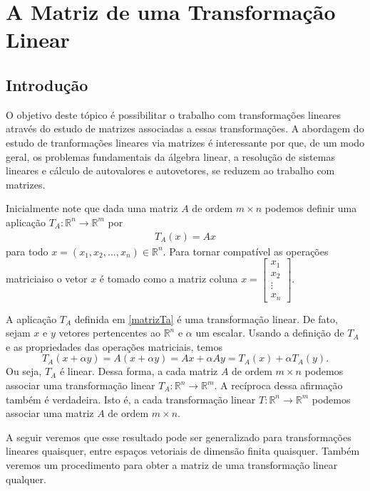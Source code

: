 \chapter{A Matriz de uma Transformação  Linear}
\thispagestyle{empty}

\section{Introdução}
O objetivo deste tópico é  possibilitar o trabalho com  transformações lineares através do estudo de  matrizes associadas a essas transformações. A abordagem do estudo de tranformações lineares via matrizes é interessante por que, de um modo geral, os problemas fundamentais da álgebra linear, a resolução de sistemas lineares e cálculo de autovalores e autovetores, se reduzem ao  trabalho com matrizes.


Inicialmente note que dada uma matriz $A$ de ordem $m\times n$ podemos definir uma aplicação $T_A: \mathbb{R}^n \rightarrow \mathbb{R}^m$ por
\begin{align}
T_A(x)=Ax \label{matrizTa}
\end{align}
para todo $x=(x_1, x_2, ..., x_n) \in \mathbb{R}^n$. Para tornar compatível as operações matriciaiso o vetor $x$ é tomado como a matriz coluna $x=\left[ \begin{array}{c}x_1 \\ x_2 \\ \vdots \\ x_n\end{array} \right]$.

 A aplicação $T_A$ definida em \eqref{matrizTa} é uma transformação  linear.  De fato, sejam  $x$ e $y$  vetores pertencentes ao $\mathbb{R}^n$ e  $\alpha$ um escalar. Usando a definição de $T_A$ e as  propriedades das operações matriciais,  temos $$T_A(x+\alpha y)=A(x+\alpha y)=Ax+\alpha Ay=T_A(x)+\alpha T_A(y).$$
Ou seja, $T_A$ é linear.  Dessa forma, a cada matriz $A$ de ordem $m\times n$ podemos associar uma transformação linear  $T_A: \mathbb{R}^n \rightarrow \mathbb{R}^m$. A recíproca dessa afirmação também é verdadeira. Isto é, a cada transformação linear $T: \mathbb{R}^n \rightarrow \mathbb{R}^m$ podemos associar uma matriz $A$ de ordem $m\times n$.


A seguir veremos  que esse resultado pode ser  generalizado  para transformações  lineares quaisquer, entre espaços vetoriais de dimensão finita quaisquer. Também veremos  um  procedimento para obter  a matriz de uma transformação linear qualquer.

